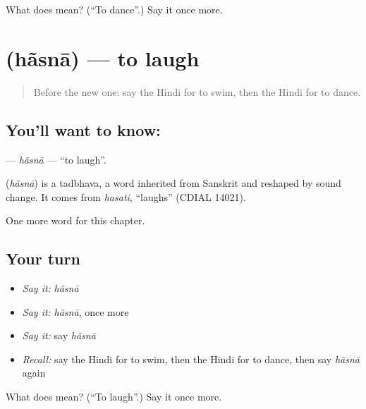 \begin{tcolorbox}[breakable,colback=teal!4,colframe=teal!35!black,title={Before you move on}]
What does  mean? (\textquotedblleft{}To dance\textquotedblright{}.) Say it once more.
\end{tcolorbox}
\section[\texorpdfstring{\hi{हँसना} (hãsnā)}{हँसना (hãsnā)}]{ (hãsnā) — to laugh}

\label{lesson:HI-C162-hasna}



\begin{quote}
Before the new one: say the Hindi for to swim, then the Hindi for to dance.
\end{quote}

\subsection*{You'll want to know: }
\textbf{} — \emph{hãsnā} — \textquotedblleft{}to laugh\textquotedblright{}.

\begin{cousinweb}
\textbf{} (\emph{hãsnā}) is a tadbhava, a word inherited from Sanskrit and reshaped by sound change. It comes from \emph{hasati}, \textquotedblleft{}laughs\textquotedblright{} (CDIAL 14021).
\end{cousinweb}

\begin{grammarlens}[title={What you've built}]
One more word for this chapter.
\end{grammarlens}

\subsection*{Your turn}
\begin{itemize}
\raggedright
  \item \emph{Say it:} \emph{hãsnā}
  \item \emph{Say it:} \emph{hãsnā}, once more
  \item \emph{Say it:} say \emph{hãsnā}
  \item \emph{Recall:} say the Hindi for to swim, then the Hindi for to dance, then say \emph{hãsnā} again
\end{itemize}

\begin{tcolorbox}[breakable,colback=teal!4,colframe=teal!35!black,title={Before you move on}]
What does  mean? (\textquotedblleft{}To laugh\textquotedblright{}.) Say it once more.
\end{tcolorbox}
